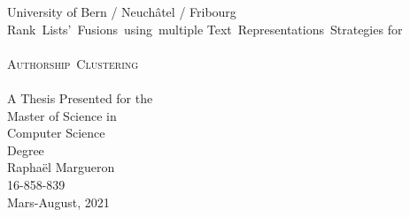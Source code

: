 \begin{titlepage}
  \vspace*{\fill}
  \begin{center}
    {\Large University of Bern / Neuchâtel / Fribourg}
    \\[3.0cm]
    {\Large Rank~Lists'~Fusions~using~multiple Text~Representations~Strategies for}
    \\[0.5cm]
    \makebox[\linewidth]{\rule{0.8\paperwidth}{0.4pt}}
    \\[0.9cm]
    {\Huge \scshape Authorship~Clustering}
    \\[0.5cm]
    \makebox[\linewidth]{\rule{0.8\paperwidth}{0.4pt}}
    \\[2.0cm]
    {\large A Thesis Presented for the \\ Master of Science in \\ Computer Science \\ Degree}
    \\[3.5cm]
    {\Large Raphaël Margueron}
    \\
    {\large 16-858-839}
    \\[0.8cm]
    {\large Mars-August, 2021}
    \\[4.0cm]
  \end{center}
  \vspace*{\fill}
\end{titlepage}
